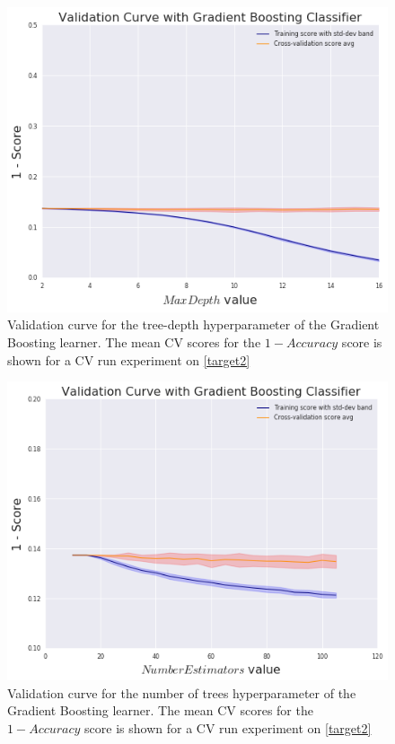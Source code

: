 \begin{figure}[h!]
	\begin{center}
		\includegraphics[width=1\linewidth]{figures/gradient-boosting/validation_curve_boosting_depth_series_f1}
		\caption{ Validation curve for the tree-depth hyperparameter of the Gradient Boosting learner.
		The mean CV scores for the $1 - Accuracy$ score is shown for a CV run experiment on \cref{target2}}
		\label{fig:boosting_validation_curves_depth_trees}

	\end{center}
\end{figure}

\begin{figure}[h!]
	\begin{center}
		\includegraphics[width=1\linewidth]{figures/gradient-boosting/validation_curve_boosting_num_trees_series_f1}
			\caption{ Validation curve for the number of trees hyperparameter of the Gradient Boosting learner. The mean CV scores for the $1 - Accuracy$ score is shown for a CV run experiment on \cref{target2}}
			\label{fig:boosting_validation_curves_num_trees}
	\end{center}
\end{figure}


